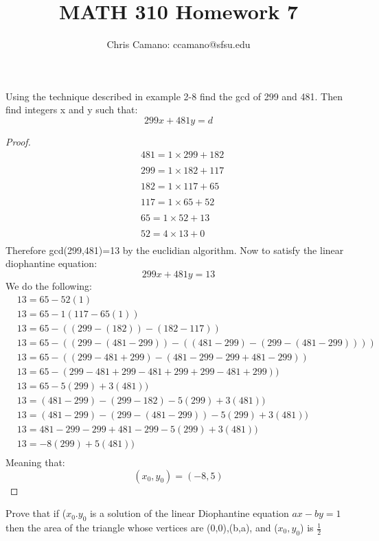 \documentclass[11pt]{article}
\author{Chris Camano: ccamano@sfsu.edu}
\title{MATH 310  Homework 7 }
\date
\theoremstyle{definition}  %
\newcommand{\block}[2]{\begin{tcolorbox}[title={#1}]{#2}\end{tcolorbox}}
\begin{document}
\maketitle
\block{Question 2.2.2}{Using the technique described in example 2-8 find the gcd of 299 and 481. Then find integers x and y such that:
\[
  299x+481y=d
\]
}
\begin{proof}
  \begin{align*}
    &481 = 1 \times 299 + 182\\\\
    &299 = 1  \times 182 + 117\\\\
    &182 = 1  \times 117 + 65\\\\
    &117 = 1  \times65 + 52\\\\
    &65 = 1  \times 52 + 13\\\\
    &52 = 4  \times 13 + 0\\
  \end{align*}
Therefore gcd(299,481)=13 by the euclidian algorithm. Now to satisfy the linear diophantine equation:
\[
    299x+481y=13
\]
We do the following:
\begin{align*}
    &13=65- 52(1)  \\
    &13=65-1(117-65(1))\\
    &13=65-((299-(182))-(182-117))\\
    &13=65-((299-(481-299))-((481-299)-(299-(481-299))))\\
    &13=65-((299-481+299)-(481-299-299+481-299))\\
    &13=65-(299-481+299-481+299+299-481+299))\\
    &13=65-5(299)+3(481))\\
    &13=(481-299)-(299-182)-5(299)+3(481))\\
    &13=(481-299)-(299-(481-299))-5(299)+3(481))\\
    &13=481-299-299+481-299-5(299)+3(481))\\
    &13=-8(299)+5(481))\\
\end{align*}
Meaning that:
\[
  (x_0,y_0)=(-8,5)
\]
\end{proof}
\block{Question 2.3.5}{Prove that if ($x_0.y_0$ is a solution of the linear Diophantine equation $ax-by=1$ then the area of the triangle whose vertices are (0,0),(b,a), and ($x_0,y_0$) is $\frac{1}{2}$}
\end{document}
